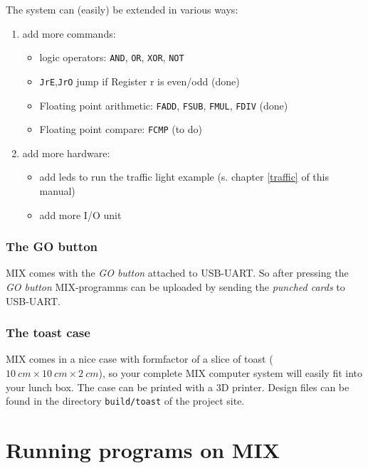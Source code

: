 \documentclass[a4paper,ngerman]{scrartcl}
\begin{document}
The system can (easily) be extended in various ways:

\begin{enumerate}
	\item add more commands:
	\begin{itemize}
		\item logic operators: \lstinline|AND|, \lstinline|OR|, \lstinline|XOR|, \lstinline|NOT|
		\item \lstinline|JrE|,\lstinline|JrO| jump if Register r is even/odd (done)
		\item Floating point arithmetic: \lstinline|FADD|, \lstinline|FSUB|, \lstinline|FMUL|, \lstinline|FDIV| (done)
		\item Floating point compare: \lstinline|FCMP| (to do)
	\end{itemize}
	\item add more hardware:
	\begin{itemize}
		\item add leds to run the traffic light example (s. chapter \ref{traffic} of this manual)
		\item add more I/O unit
	\end{itemize}
\end{enumerate}

\subsubsection{The GO button}
MIX comes with the \textit{GO button} attached to USB-UART. So after pressing the \textit{GO button} MIX-programms can be uploaded by sending the \textit{punched cards} to USB-UART.

\subsubsection{The toast case}
MIX comes in a nice case with formfactor of a slice of toast ($\SI{10}{cm} \times \SI{10}{cm} \times \SI{2}{cm}$), so your complete MIX computer system will easily fit into your lunch box. The case can be printed with a 3D printer. Design files can be found in the directory \lstinline|build/toast| of the project site.


\section{Running programs on MIX}
\end{document}
